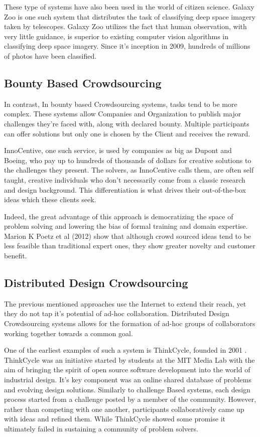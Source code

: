 These type of systems have also been used in the world of citizen science\cite{sauermann2015crowd}. Galaxy Zoo is one such system that distributes the task of classifying deep space imagery taken by telescopes\cite{galaxyzoo}. Galaxy Zoo utilizes the fact that human observation, with very little guidance, is superior to existing computer vision algorithms in classifying deep space imagery. Since it's inception in 2009, hundreds of millions of photos have been classified. 

\subsection{Bounty Based Crowdsourcing}

In contrast, In bounty based Crowdsourcing systems, tasks tend to be more complex. These systems allow Companies and Organization to publish major challenges they're faced with, along with declared bounty. Multiple participants can offer solutions but only one is chosen by the Client and receives the reward.   

InnoCentive\cite{innocentive}, one such service, is used by companies as big as Dupont and Boeing, who pay up to hundreds of thousands of dollars for creative solutions to the challenges they present. The solvers, as InnoCentive calls them, are often self taught, creative individuals who don't necessarily come from a classic research and design background. This differentiation is what drives their out-of-the-box ideas which these clients seek. \cite{howe2006rise}

Indeed, the great advantage of this approach is democratizing the space of problem solving and lowering the bias of formal training and domain expertise. Marion K Poetz et al (2012)\cite{poetz2012value} show that although crowd sourced ideas tend to be less feasible than traditional expert ones, they show greater novelty and customer benefit. 

\subsection{Distributed Design Crowdsourcing}

The previous mentioned approaches use the Internet to extend their reach, yet they do not tap it's potential of ad-hoc collaboration. Distributed Design Crowdsourcing systems allows for the formation of ad-hoc groups of collaborators working together towards a common goal.  

One of the earliest examples of such a system is ThinkCycle, founded in 2001 \cite{sawhney2002thinkcycle}. ThinkCycle was an initiative started by students at the MIT Media Lab with the aim of bringing the spirit of open source software development into the world of industrial design. It’s key component was an online shared database of problems and evolving design solutions. Similarly to challenge Based systems, each design process started from a challenge posted by a member of the community. However, rather than competing with one another, participants collaboratively came up with ideas and refined them. While ThinkCycle showed some promise it ultimately failed in sustaining a community of problem solvers.

